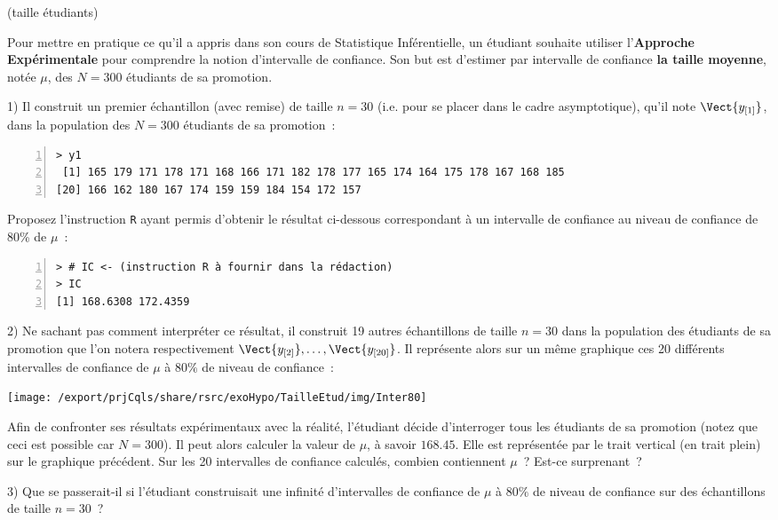\documentclass[10pt]{report}
\begin{document}
\begin{exercice} (taille étudiants)

Pour mettre en pratique ce qu'il a appris dans son cours de Statistique Inf{\'e}rentielle, un {\'e}tudiant souhaite utiliser l'\textbf{Approche Exp{\'e}rimentale} pour comprendre la notion d'intervalle de confiance. Son but est d'estimer par intervalle de confiance  \textbf{la taille moyenne}, not{\'e}e $\mu$, des $N=300$ {\'e}tudiants de sa promotion. 

1) Il construit un premier {\'e}chantillon (avec remise) de taille $n=30$ (i.e. pour se placer dans le cadre asymptotique), qu'il note $\Vect{y_{[1]}}$, dans la population des $N=300$ {\'e}tudiants de sa promotion~:

\begin{Verbatim}[frame=leftline,fontfamily=tt,fontshape=n,numbers=left]
> y1
 [1] 165 179 171 178 171 168 166 171 182 178 177 165 174 164 175 178 167 168 185
[20] 166 162 180 167 174 159 159 184 154 172 157
\end{Verbatim}


Proposez l'instruction \texttt{R} ayant permis d'obtenir le résultat ci-dessous correspondant à un intervalle de confiance au niveau de confiance de 80\% de $\mu$~:

\IndicR
\begin{Verbatim}[frame=leftline,fontfamily=tt,fontshape=n,numbers=left]
> # IC <- (instruction R à fournir dans la rédaction)
> IC
[1] 168.6308 172.4359
\end{Verbatim}





2) Ne sachant pas comment interpr{\'e}ter ce r{\'e}sultat, il construit 19 autres {\'e}chantillons de taille $n=30$ dans la population des {\'e}tudiants de sa promotion que l'on notera respectivement $\Vect{y_{[2]}},\ldots,\Vect{y_{[20]}}$. Il repr{\'e}sente alors sur un m{\^e}me graphique ces 20 diff{\'e}rents intervalles de confiance de $\mu$ {\`a} $80\%$ de niveau de confiance~:
\begin{center}
\texttt{[image: /export/prjCqls/share/rsrc/exoHypo/TailleEtud/img/Inter80]} 
\end{center}

Afin de confronter ses r{\'e}sultats exp{\'e}rimentaux avec la r{\'e}alit{\'e}, l'{\'e}tudiant d{\'e}cide d'interroger tous les {\'e}tudiants de sa promotion (notez que ceci est possible car $N=300$). Il peut alors calculer la valeur de $\mu$, {\`a} savoir $168.45$. Elle est repr{\'e}sent{\'e}e par le trait vertical (en trait plein) sur le graphique pr{\'e}c{\'e}dent. Sur les 20 intervalles de confiance calcul{\'e}s, combien contiennent $\mu$~? Est-ce surprenant~? 




3) Que se passerait-il si l'{\'e}tudiant construisait une infinit{\'e} d'intervalles de confiance de $\mu$ {\`a} $80\%$ de niveau de confiance sur des {\'e}chantillons de taille $n=30$~? \\



\end{exercice}
\end{document}
